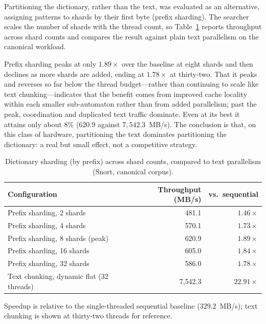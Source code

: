 \newpage
{}

Partitioning the dictionary, rather than the text, was evaluated as an alternative,
assigning patterns to shards by their first byte (prefix sharding). The searcher
scales the number of shards with the thread count, so Table~\ref{tab:shard} reports
throughput across shard counts and compares the result against plain text
parallelism on the canonical workload.

Prefix sharding peaks at only $1.89\times$ over the baseline at eight shards and
then declines as more shards are added, ending at $1.78\times$ at thirty-two. That
it peaks and reverses so far below the thread budget---rather than continuing to
scale like text chunking---indicates that the benefit comes from improved cache
locality within each smaller sub-automaton rather than from added parallelism; past
the peak, coordination and duplicated text traffic dominate. Even at its best it
attains only about $8\%$
($620.9$ against $7{,}542.3$~MB/s). The conclusion is that, on this class of
hardware, partitioning the text dominates partitioning the dictionary: a real but
small effect, not a competitive strategy.

\begin{table}[H]
    \centering
    \caption{Dictionary sharding (by prefix) across shard counts, compared to text
    parallelism (Snort, canonical corpus).}
    \label{tab:shard}
    \small
    \begin{tabular}{@{} l r r @{}}
        \toprule
        \textbf{Configuration} & \textbf{Throughput (MB/s)} & \textbf{vs.\ sequential} \\
        \midrule
        Prefix sharding, 2 shards          & 481.1 & $1.46\times$ \\ \addlinespace
        Prefix sharding, 4 shards          & 570.1 & $1.73\times$ \\ \addlinespace
        Prefix sharding, 8 shards (peak)   & 620.9 & $1.89\times$ \\ \addlinespace
        Prefix sharding, 16 shards         & 605.0 & $1.84\times$ \\ \addlinespace
        Prefix sharding, 32 shards         & 586.0 & $1.78\times$ \\
        \midrule
        Text chunking, dynamic flat (32 threads) & 7{,}542.3 & $22.91\times$ \\
        \bottomrule
    \end{tabular}

    {\footnotesize\raggedright Speedup is relative to the single-threaded sequential baseline ($329.2$~MB/s); text chunking is shown at thirty-two threads for reference.\par}
\end{table}

